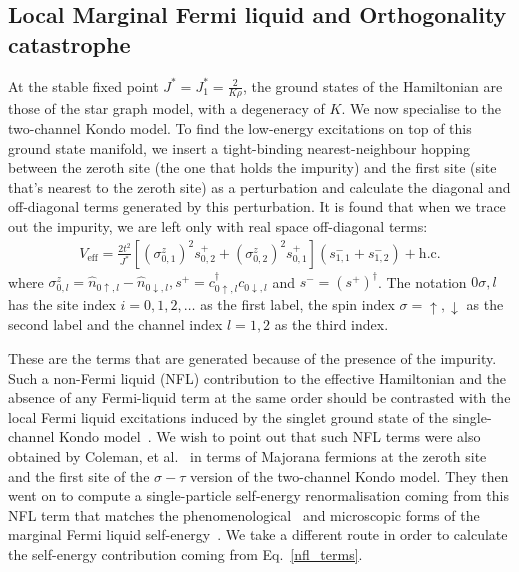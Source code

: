\documentclass[reprint,prb,superscriptaddress]{revtex4-2}
\begin{document}
\subsection{Local Marginal Fermi liquid and Orthogonality catastrophe}
At the stable fixed point \(J ^* = J_1^* = \frac{2}{K \rho}\), the ground states of the Hamiltonian are those of the star graph model, with a degeneracy of \(K\). We now specialise to the two-channel Kondo model. To find the low-energy excitations on top of this ground state manifold, we insert a tight-binding nearest-neighbour hopping between the zeroth site (the one that holds the impurity) and the first site (site that's nearest to the zeroth site) as a perturbation and calculate the diagonal and off-diagonal terms generated by this perturbation. It is found that when we trace out the impurity, we are left only with real space off-diagonal terms:
\begin{equation}\begin{aligned}
	\label{nfl_terms}
	V_\text{eff} = \frac{2t^2}{J^*}\left[\left(\sigma^z_{0,1}\right)^2 s^+_{0,2} + \left(\sigma^z_{0,2}\right)^2 s^+_{0,1}\right] \left(s^-_{1,1} + s^-_{1,2}\right) + \text{h.c.}
\end{aligned}\end{equation}
where \(\sigma^z_{0,l} = \hat n_{0\uparrow,l} - \hat n_{0\downarrow,l}, s^+ = c^\dagger_{0 \uparrow,l}c_{0 \downarrow,l}\) and \(s^- = \left(s^+\right)^\dagger\). The notation \(0\sigma,l\) has the site index \(i=0,1,2,\ldots\) as the first label, the spin index \(\sigma=\uparrow,\downarrow\) as the second label and the channel index \(l=1,2\) as the third index.

These are the terms that are generated because of the presence of the impurity. Such a non-Fermi liquid (NFL) contribution to the effective Hamiltonian and the absence of any Fermi-liquid term at the same order should be contrasted with the local Fermi liquid excitations induced by the singlet ground state of the single-channel Kondo model~\cite{nozieres1974fermi,wilson1975renormalization,hewson1993}. We wish to point out that such NFL terms were also obtained by Coleman, et al.~\cite{Coleman_tsvelik} in terms of Majorana fermions at the zeroth site and the first site of the \(\sigma-\tau\) version of the two-channel Kondo model. They then went on to compute a single-particle self-energy renormalisation coming from this NFL term that matches the phenomenological~\cite{varma2002singular} and microscopic forms of the marginal Fermi liquid self-energy~\cite{anirbanmott1,anirbanurg1}. We take a different route in order to calculate the self-energy contribution coming from Eq.~\ref{nfl_terms}.
\end{document}
